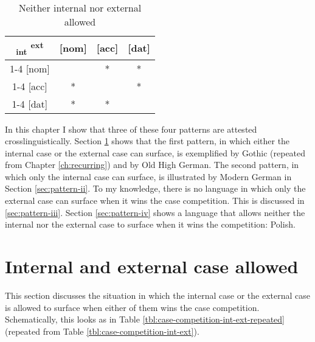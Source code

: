 \begin{table}[H]
  \center
  \caption{Neither internal nor external allowed}
  \begin{tabular}{c|c|c|c}
    \toprule
    \textsubscript{\ac{int}} \textsuperscript{\ac{ext}}
           & [\ac{nom}]
           & [\ac{acc}]
           & [\ac{dat}]
           \\ \cmidrule{1-4}
       [\ac{nom}]
           & \xcancel{\phantom{xx}}
           & *
           & *
           \\ \cmidrule{1-4}
       [\ac{acc}]
           & *
           & \xcancel{\phantom{xx}}
           & *
           \\ \cmidrule{1-4}
       [\ac{dat}]
           & *
           & *
           & \xcancel{\phantom{xx}}
           \\
     \bottomrule
  \end{tabular}
    \label{tbl:case-competition-none}
\end{table}

In this chapter I show that three of these four patterns are attested crosslinguistically. Section \ref{sec:pattern-i} shows that the first pattern, in which either the internal case or the external case can surface, is exemplified by Gothic (repeated from Chapter \ref{ch:recurring}) and by Old High German. The second pattern, in which only the internal case can surface, is illustrated by Modern German in Section \ref{sec:pattern-ii}. To my knowledge, there is no language in which only the external case can surface when it wins the case competition. This is discussed in \ref{sec:pattern-iii}. Section \ref{sec:pattern-iv} shows a language that allows neither the internal nor the external case to surface when it wins the competition: Polish.


\section{Internal and external case allowed}\label{sec:pattern-i}

This section discusses the situation in which the internal case or the external case is allowed to surface when either of them wins the case competition. Schematically, this looks as in Table \ref{tbl:case-competition-int-ext-repeated} (repeated from Table \ref{tbl:case-competition-int-ext}).

